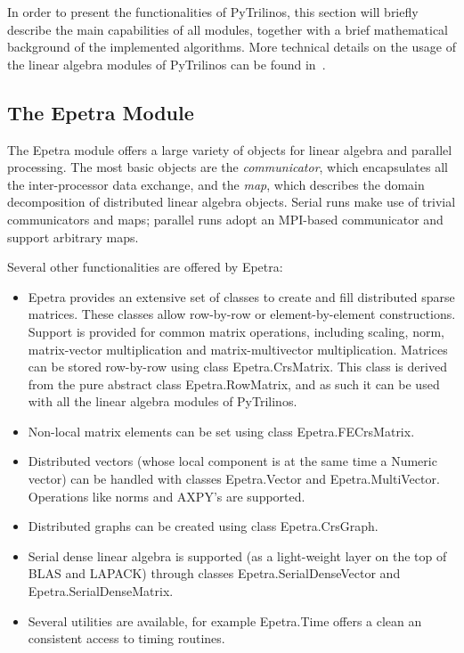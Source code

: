 \documentclass[acmtocl]{acmtrans2m}
\begin{document}
In order to present the functionalities of PyTrilinos, this section
will briefly describe the main capabilities of all modules, together
with a brief mathematical background of the implemented algorithms.
More technical details on the usage of the linear algebra modules of
PyTrilinos can be found in~\cite{pytrilinos-la-guide}.

\subsection{The Epetra Module}
\label{subsec:epetra}

The Epetra module offers a large variety of objects for linear algebra and
parallel processing. The most basic objects are the
{\sl communicator}, which
  encapsulates all the inter-processor data exchange, and the
  {\sl map}, which describes the domain decomposition of
  distributed linear algebra objects. Serial runs make use of trivial
  communicators and maps; parallel runs adopt an MPI-based
  communicator and support arbitrary maps.

Several other functionalities are offered by Epetra:
\begin{itemize}
\item
Epetra provides an extensive set of classes to create and fill
distributed sparse matrices. These classes allow row-by-row or
element-by-element constructions. Support is provided for common
matrix operations, including scaling, norm, matrix-vector
multiplication and matrix-multivector multiplication.
Matrices can be stored row-by-row using
class Epetra.CrsMatrix. This class is derived from the pure abstract class
Epetra.RowMatrix, and as such it can be used with all the linear algebra
modules of PyTrilinos.
\item Non-local matrix elements can be set using class Epetra.FECrsMatrix.
\item Distributed vectors (whose local component is at the same time a
                           Numeric vector) can be handled with classes
Epetra.Vector and Epetra.MultiVector. Operations like norms and AXPY's are
supported.
\item Distributed graphs can be created using class Epetra.CrsGraph.
\item Serial dense linear algebra is supported
(as a light-weight layer on the top of BLAS and LAPACK) through
classes Epetra.SerialDenseVector and Epetra.SerialDenseMatrix.
\item Several utilities are available, for example Epetra.Time offers a clean
an consistent access to timing routines.
\end{itemize}
\end{document}
